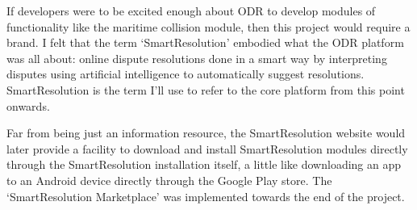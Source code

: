 If developers were to be excited enough about ODR to develop modules of functionality like the maritime collision module, then this project would require a brand. I felt that the term `SmartResolution' embodied what the ODR platform was all about: online dispute resolutions done in a smart way by interpreting disputes using artificial intelligence to automatically suggest resolutions. SmartResolution is the term I'll use to refer to the core platform from this point onwards.

Far from being just an information resource, the SmartResolution website would later provide a facility to download and install SmartResolution modules directly through the SmartResolution installation itself, a little like downloading an app to an Android device directly through the Google Play store. The `SmartResolution Marketplace' was implemented towards the end of the project.